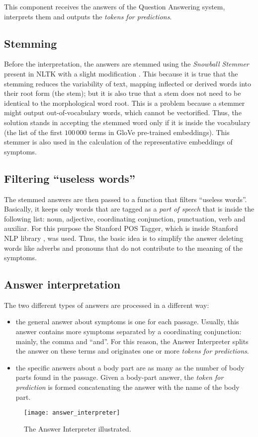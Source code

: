 This component receives the answers of the Question Answering system, interprets them and outputs the \textit{tokens for predictions}.

\subsection{Stemming}
\label{sec:stemming}
Before the interpretation, the answers are stemmed using the \textit{Snowball Stemmer} present in NLTK with a slight modification \cite{snowballstemmer, nltk}. This because it is true that the stemming reduces the variability of text, mapping inflected or derived words into their root form (the stem); but it is also true that a stem does not need to be identical to the morphological word root. This is a problem because a stemmer might output out-of-vocabulary words, which cannot be vectorified. Thus, the solution stands in accepting the stemmed word only if it is inside the vocabulary (the list of the first $100\,000$ terms in GloVe pre-trained embeddings). This stemmer is also used in the calculation of the representative embeddings of symptoms.

\subsection{Filtering ``useless words''}
The stemmed answers are then passed to a function that filters ``useless words''. Basically, it keeps only words that are tagged as a \textit{part of speech} that is inside the following list: noun, adjective, coordinating conjunction, punctuation, verb and auxiliar. For this purpose the Stanford POS Tagger, which is inside Stanford NLP library \cite{stanfordnlp}, was used. Thus, the basic idea is to simplify the answer deleting words like adverbs and pronouns that do not contribute to the meaning of the symptoms.

\subsection{Answer interpretation}
The two different types of answers are processed in a different way:
\begin{itemize}
  \item the general answer about symptoms is one for each passage. Usually, this answer contains more symptoms separated by a coordinating conjunction: mainly, the comma and ``and''. For this reason, the Answer Interpreter splits the answer on these terms and originates one or more \textit{tokens for predictions}.
  \item the specific answers about a body part are as many as the number of body parts found in the passage. Given a body-part answer, the \textit{token for prediction} is formed concatenating the answer with the name of the body part.
\end{itemize}

\begin{figure}[h]
\centering
\texttt{[image: answer\_interpreter]}
\caption{The Answer Interpreter illustrated.}
\medskip
\label{fig:answer_int}
\end{figure}
